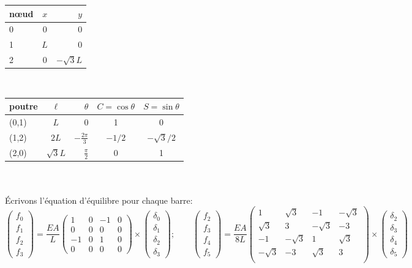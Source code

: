 \documentclass[a4paper]{article}
\begin{document}
\begin{tabular}{|l|c|r|}
  \hline
  nœud & $x$  & $y$ \\
  \hline
  0 & 0 & 0 \\
  1& $L$& 0 \\
  2& 0 & $-\sqrt 3 L$ \\
  \hline
\end{tabular} $\hspace{1cm}$  \begin{tabular}{|l|c|r|c|c|}
  \hline
  poutre & $\ell$  & $\theta$ & $C=\cos\theta$ & $S=\sin\theta$\\
  \hline
  (0,1) & $L$ & 0 & 1 & 0 \\
  (1,2)& $2L$& $-\frac{2\pi}{3}$&$-1/2$&$-\sqrt 3/2 $\\
  (2,0)& $\sqrt 3L$ &$\frac{\pi}{2}$ &0 &1 \\
  \hline
\end{tabular}
\\
\\
Écrivons l'équation d'équilibre pour chaque barre:
\[ \left(\begin{array}{r}f_0\\ f_1\\f_2\\f_3 \end{array}\right) 
 =\frac{EA}{L}\left(\begin{array}{rrrr} 
1&0&-1&0\\
0&0&0&0\\
-1&0&1&0\\
0&0&0&0
\end{array}\right)\times
\left(\begin{array}{r} \delta_0\\\delta_1\\\delta_2\\\delta_3 \end{array}\right) 
; \qquad
\left(\begin{array}{r}f_2\\ f_3\\f_4\\f_5 \end{array}\right) 
=\frac{EA}{8L}\left(\begin{array}{rrrr} 
1&\sqrt 3&-1&-\sqrt 3\\
\sqrt 3&3&-\sqrt 3&-3\\
-1&-\sqrt 3&1&\sqrt 3\\
-\sqrt 3&-3&\sqrt 3&3\\
\end{array}\right)\times
\left(\begin{array}{r} \delta_2\\ \delta_3\\\delta_4\\\delta_5 \end{array}\right) 
\]
\end{document}
